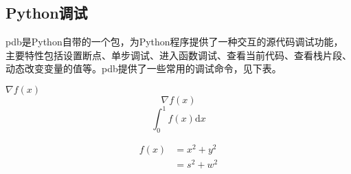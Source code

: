 \documentclass[12pt,a4paper]{article}
\title{}
\author{作者}
\date{\chntoday}
\begin{document}
\maketitle
\newpage
\subsection{Python调试}
pdb是Python自带的一个包，为Python程序提供了一种交互的源代码调试功能，主要特性包括设置断点、单步调试、进入函数调试、查看当前代码、查看栈片段、动态改变变量的值等。pdb提供了一些常用的调试命令，见下表。

$\nabla f(x)$
$$\nabla f(x)$$
\begin{equation}
    \int_0^1f(x)\mathrm{d}x
\end{equation}

\begin{equation*}
\begin{aligned}
f(x)&=x^2+y^2\\
&=s^2+w^2
\end{aligned}
\end{equation*}














































\cite{tam19912d}

\end{document}
